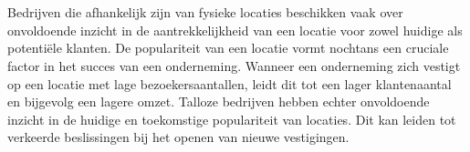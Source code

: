 
\chapter{}%
\label{ch:inleiding}



\section{}%
\label{sec:probleemstelling}


Bedrijven die afhankelijk zijn van fysieke locaties beschikken vaak over onvoldoende inzicht in de aantrekkelijkheid van een locatie voor zowel huidige als potentiële klanten. De populariteit van een locatie vormt nochtans een cruciale factor in het succes van een onderneming. Wanneer een onderneming zich vestigt op een locatie met lage bezoekersaantallen, leidt dit tot een lager klantenaantal en bijgevolg een lagere omzet. Talloze bedrijven hebben echter onvoldoende inzicht in de huidige en toekomstige populariteit van locaties. Dit kan leiden tot verkeerde beslissingen bij het openen van nieuwe vestigingen.

